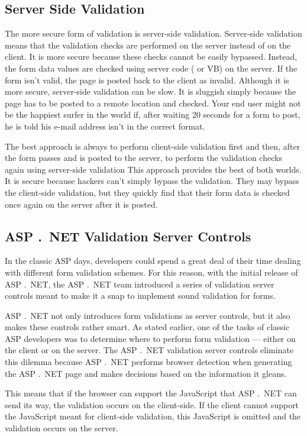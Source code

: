 \subsection{Server Side Validation}
The more secure form of validation is server-side validation. Server-side validation means that the validation checks are performed on the server instead of on the client. It is more secure because these checks cannot be easily bypassed. Instead, the form data values are checked using server code ({\cs} or VB) on the server. If the form isn’t valid, the page is posted back to the client as invalid. Although it is more secure,
server-side validation can be slow. It is sluggish simply because the page has to be posted to a remote
location and checked. Your end user might not be the happiest surfer in the world if, after waiting 20
seconds for a form to post, he is told his e-mail address isn’t in the correct format.

The best approach is always to perform client-side validation first and then, after the form passes and is posted to the server, to perform the validation checks
again using server-side validation This approach provides the best of both worlds. It is secure because
hackers can’t simply bypass the validation. They may bypass the client-side validation, but they quickly
find that their form data is checked once again on the server after it is posted. 

\subsection{ASP .\ NET Validation Server Controls}
In the classic ASP days, developers could spend a great deal of their time dealing with different form
validation schemes. For this reason, with the initial release of ASP .\ NET, the ASP .\ NET team introduced a
series of validation server controls meant to make it a snap to implement sound validation for forms.

ASP .\ NET not only introduces form validations as server controls, but it also makes these controls rather
smart. As stated earlier, one of the tasks of classic ASP developers was to determine where to perform
form validation — either on the client or on the server. The ASP .\ NET validation server controls eliminate
this dilemma because ASP .\ NET performs browser detection when generating the ASP .\ NET page and
makes decisions based on the information it gleans.

This means that if the browser can support the JavaScript that ASP .\ NET can send its way, the validation
occurs on the client-side. If the client cannot support the JavaScript meant for client-side validation, this
JavaScript is omitted and the validation occurs on the server.

